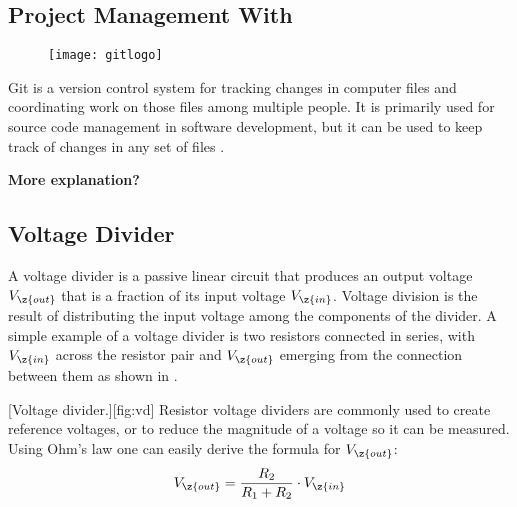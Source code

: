 \newpage
\subsection{Project Management With}
\begin{figure}[h!]\vspace*{-1.43cm}\hspace*{6.7cm}\texttt{[image: gitlogo]}\end{figure}\vspace*{-.4cm}\noindent
Git is a version control system for tracking changes in computer files and coordinating work on those files among multiple people. It is primarily used for source code management in software development, but it can be used to keep track of changes in any set of files \cite{wiki:2}.\par
\begin{huge}\textbf{More explanation?}\end{huge}

\subsection{Voltage Divider}\label{sec:vd}
A voltage divider is a passive linear circuit that produces an output voltage $V_{\z{out}}$ that is a fraction of its input voltage $V_{\z{in}}$. Voltage division is the result of distributing the input voltage among the components of the divider. A simple example of a voltage divider is two resistors connected in series, with $V_{\z{in}}$ across the resistor pair and $V_{\z{out}}$ emerging from the connection between them as shown in .\par
{}[Voltage divider.][fig:vd]
Resistor voltage dividers are commonly used to create reference voltages, or to reduce the magnitude of a voltage so it can be measured. Using Ohm's law one can easily derive the formula for $V_{\z{out}}$:
\begin{equation}
	V_{\z{out}} = \frac{R_{2}}{R_{1} + R_{2}}\cdot V_{\z{in}}\label{eq:vd}
\end{equation}

